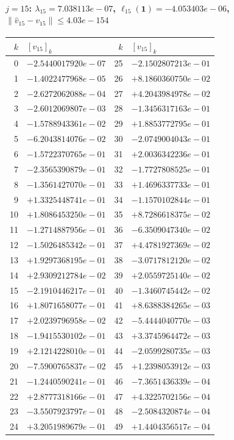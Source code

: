 \documentclass[11pt]{article}
\begin{document}
\paragraph{$j = 15$: $\lambda_{15} = 7.038113e-07$, \quad $\ell_{15}(\mathbf{1}) = -4.053403e-06$, \quad $\|\hat v_{15} - v_{15}\| \leq 4.03e-154$}
\begin{center}
{\footnotesize
\begin{tabular}{r@{\;\;}l@{\quad}r@{\;\;}l}
\toprule
$k$ & $[v_{15}]_k$ & $k$ & $[v_{15}]_k$ \\
\midrule
0 & $-2.5440017920e-07$ & 25 & $-2.1502807213e-01$ \\
1 & $-1.4022477968e-05$ & 26 & $+8.1860360750e-02$ \\
2 & $-2.6272062088e-04$ & 27 & $+4.2043984978e-02$ \\
3 & $-2.6012069807e-03$ & 28 & $-1.3456317163e-01$ \\
4 & $-1.5788943361e-02$ & 29 & $+1.8853772795e-01$ \\
5 & $-6.2043814076e-02$ & 30 & $-2.0749004043e-01$ \\
6 & $-1.5722370765e-01$ & 31 & $+2.0036342236e-01$ \\
7 & $-2.3565390879e-01$ & 32 & $-1.7727808525e-01$ \\
8 & $-1.3561427070e-01$ & 33 & $+1.4696337733e-01$ \\
9 & $+1.3325448741e-01$ & 34 & $-1.1570102844e-01$ \\
10 & $+1.8086453250e-01$ & 35 & $+8.7286618375e-02$ \\
11 & $-1.2714887956e-01$ & 36 & $-6.3509047340e-02$ \\
12 & $-1.5026485342e-01$ & 37 & $+4.4781927369e-02$ \\
13 & $+1.9297368195e-01$ & 38 & $-3.0717812120e-02$ \\
14 & $+2.9309212784e-02$ & 39 & $+2.0559725140e-02$ \\
15 & $-2.1910446217e-01$ & 40 & $-1.3460745442e-02$ \\
16 & $+1.8071658077e-01$ & 41 & $+8.6388384265e-03$ \\
17 & $+2.0239796958e-02$ & 42 & $-5.4444040770e-03$ \\
18 & $-1.9415530102e-01$ & 43 & $+3.3745964472e-03$ \\
19 & $+2.1214228010e-01$ & 44 & $-2.0599280735e-03$ \\
20 & $-7.5900765837e-02$ & 45 & $+1.2398053912e-03$ \\
21 & $-1.2440590241e-01$ & 46 & $-7.3651436339e-04$ \\
22 & $+2.8777318166e-01$ & 47 & $+4.3225702156e-04$ \\
23 & $-3.5507923797e-01$ & 48 & $-2.5084320874e-04$ \\
24 & $+3.2051989679e-01$ & 49 & $+1.4404356517e-04$ \\
\bottomrule
\end{tabular}
}
\end{center}
\end{document}
